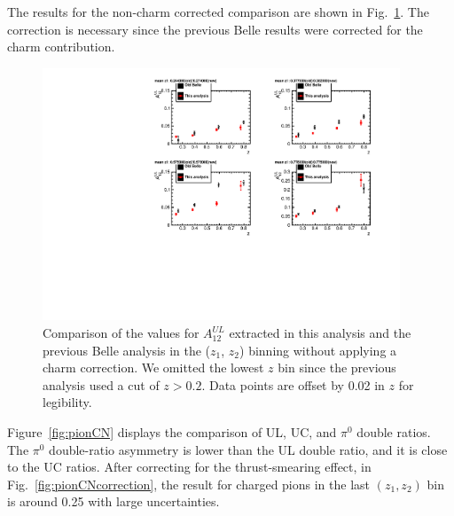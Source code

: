 The results for the non-charm corrected comparison are shown in Fig.~\ref{fig:belleComp}. 
The correction is necessary since the previous Belle results were corrected for the charm contribution.
\begin{figure}[t]
\includegraphics[width=0.95\textwidth]{figure_asy/BelleCompZ25.pdf}
\caption[Comparison of the values for $A^{UL}_{12}$ extracted in this analysis without charm correction and the previous Belle analysis in the ($z_1$, $z_2$) binning]{\label{fig:belleComp} Comparison of the values for $A^{UL}_{12}$ extracted in this analysis and the previous Belle analysis in the ($z_1$, $z_2$) binning without applying a charm correction. We omitted the lowest $z$ bin since the previous analysis used a cut of $z>0.2$. Data points are offset by 0.02 in $z$ for legibility.}
\end{figure}

Figure~\ref{fig:pionCN} displays the comparison of UL, UC, and $\pi^0$ double ratios. The $\pi^0$ double-ratio asymmetry is lower than the UL double ratio, and it is close to the UC ratios. After correcting for the thrust-smearing effect, in Fig.~\ref{fig:pionCNcorrection}, the result for charged pions in the last $(z_1,z_2)$ bin is around 0.25 with large uncertainties. 

